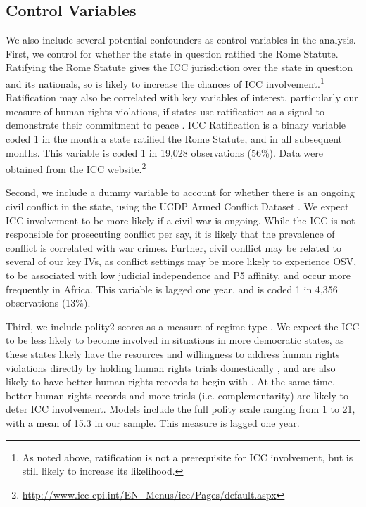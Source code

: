 \subsection*{Control Variables}

We also include several potential confounders as control variables in the analysis. First, we control for whether the state in question ratified the Rome Statute. Ratifying the Rome Statute gives the ICC jurisdiction over the state in question and its nationals, so is likely to increase the chances of ICC involvement.\footnote{As noted above, ratification is not a prerequisite for ICC involvement, but is still likely to increase its likelihood.} Ratification may also be correlated with key variables of interest, particularly our measure of human rights violations, if states use ratification as a signal to demonstrate their commitment to peace \citep{simmons2010credible}. ICC Ratification is a binary variable coded 1 in the month a state ratified the Rome Statute, and in all subsequent months. This variable is coded 1 in 19,028 observations (56\%). Data were obtained from the ICC website.\footnote{\url{http://www.icc-cpi.int/EN\_Menus/icc/Pages/default.aspx}}

Second, we include a dummy variable to account for whether there is an ongoing civil conflict in the state, using the UCDP Armed Conflict Dataset \citep{themner2012armed}. We expect ICC involvement to be more likely if a civil war is ongoing. While the ICC is not responsible for prosecuting conflict per say, it is likely that the prevalence of conflict is correlated with war crimes. Further, civil conflict may be related to several of our key IVs, as conflict settings may be more likely to experience OSV, to be associated with low judicial independence and P5 affinity, and occur more frequently in Africa. This variable is lagged one year, and is coded 1 in 4,356 observations (13\%).

Third, we include polity2 scores as a measure of regime type \citep{marshall2018polity}. We expect the ICC to be less likely to become involved in situations in more democratic states, as these states likely have the resources and willingness to address human rights violations directly by holding human rights trials domestically \citep{kim2010explaining, herz1982dictatorship}, and are also likely to have better human rights records to begin with \citep{davenport:armstrongii:2004, davenport2007state}. At the same time, better human rights records and more trials (i.e. complementarity) are likely to deter ICC involvement. Models include the full polity scale ranging from 1 to 21, with a mean of 15.3 in our sample. This measure is lagged one year.

